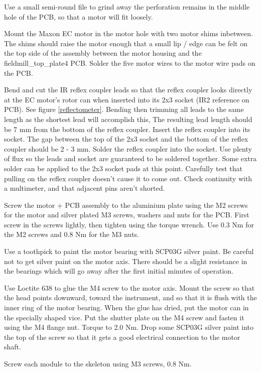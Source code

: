 \documentclass{article}
\begin{document}
Use a small semi-round file to grind away the perforation remains in the middle hole of the PCB,
so that a motor will fit loosely.

Mount the Maxon EC motor in the motor hole with two motor shims inbetween.
The shims should raise the motor enough that a small lip / edge can be felt on the top side of the assembly between the motor housing and the fieldmill\_top\_plate4 PCB.
Solder the five motor wires to the motor wire pads on the PCB.

Bend and cut the IR reflex coupler leads so that the reflex coupler looks directly at the EC motor's rotor can when inserted into its 2x3 socket (IR2 reference on PCB). See figure \vref{reflectometer}.
Bending then trimming all leads to the same length as the shortest lead will accomplish this,
The resulting lead length should be 7 mm from the bottom of the reflex coupler.
Insert the reflex coupler into its socket.
The gap between the top of the 2x3 socket and the bottom of the reflex coupler should be 2 - 3 mm.
Solder the reflex coupler into the socket. Use plenty of flux so the leads and socket are guaranteed to be soldered together.
Some extra solder can be applied to the 2x3 socket pads at this point.
Carefully test that pulling on the reflex coupler doesn't cause it to come out.
Check continuity with a multimeter, and that adjacent pins aren't shorted.

Screw the motor + PCB assembly to the aluminium plate using the M2 screws for the motor and silver plated M3 screws, washers and nuts for the PCB.
First screw in the screws lightly, then tighten using the torque wrench. Use 0.3 Nm for the M2 screws and 0.8 Nm for the M3 nuts.

Use a toothpick to paint the motor bearing with SCP03G silver paint.
Be careful not to get silver paint on the motor axis.
There should be a slight resistance in the bearings which will go away after the first initial minutes of operation.

Use Loctite 638 to glue the M4 screw to the motor axis.
Mount the screw so that the head points downward, toward the instrument,
and so that it is flush with the inner ring of the motor bearing.
When the glue has dried, put the motor can in the specially shaped vice.
Put the shutter plate on the M4 screw and fasten it using the M4 flange nut.
Torque to 2.0 Nm.
Drop some SCP03G silver paint into the top of the screw so that it gets a good electrical connection to the motor shaft.

Screw each module to the skeleton using M3 screws, 0.8 Nm.
\end{document}
